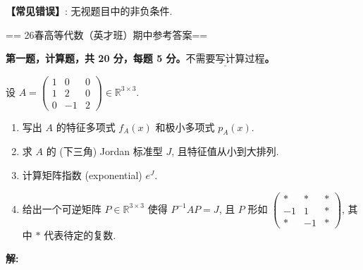 \textbf{【常见错误】}: 无视题目中的非负条件.

== 26春高等代数（英才班）期中参考答案==

\textbf{第一题，计算题，共 20 分，每题 5 分。$\underline{不需要写计算过程}$。}

设
\(A = \begin{pmatrix} 1 & 0 & 0 \\ 1 & 2 & 0 \\ 0 & -1 & 2 \end{pmatrix} \in \mathbb{R}^{3\times 3}\).

\begin{enumerate}
\def\labelenumi{\arabic{enumi}.}
\item
  写出 $A$ 的特征多项式 \(f_{A}(x)\) 和极小多项式 \(p_{A}(x)\).
\item
  求 $A$ 的 (下三角) Jordan 标准型 $J$, 且特征值从小到大排列.
\item
  计算矩阵指数 (exponential) \(e^{J}\).
\item
  给出一个可逆矩阵 \(P \in \mathbb{R}^{3 \times 3}\) 
  使得 \(P^{-1}AP = J\), 且 \(P\) 形如
  \(\begin{pmatrix} * & * & *\\ -1 & 1 & *\\ * & -1 & * \end{pmatrix}\), 
  其中 \(*\) 代表待定的复数.
\end{enumerate}

\textbf{解:}

